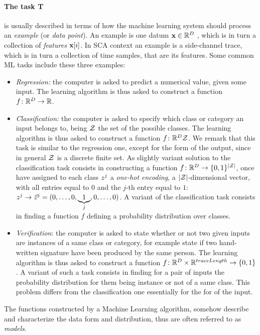 \paragraph*{The task T} is usually described in terms of how the machine learning system should process an \emph{example} (or \emph{data point}). An example is one datum $\textbf{x}\in \mathbb{R}^D$ , which is in turn a collection of \emph{features} $\textbf{x}[i]$. In SCA context an example is a side-channel trace, which is in turn a collection of time samples, that are its features. Some common ML tasks include these three examples: 
\begin{itemize}
\item \emph{Regression: } the computer is asked to predict a numerical value, given some input. The learning algorithm is thus asked to construct a function $f\colon \mathbb{R}^D \rightarrow \mathbb{R}$.
\item \emph{Classification: } the computer is asked to specify which class or category an input belongs to, being $\mathcal{Z}$ the set of the possible classes. The learning algorithm is thus asked to construct a function $f\colon \mathbb{R}^D \mathcal{Z}$. We remark that this task is similar to the regression one, except for the form of the output, since in general $\mathcal{Z}$ is a discrete finite set. As slightly variant solution to the classification task consists in constructing a function $f\colon \mathbb{R}^D \rightarrow \{0,1\}^{\lvert\mathcal{Z}\rvert}$, once have assigned to each class $z^j$ a \emph{one-hot encoding}, \ie  a $\lvert\mathcal{Z}\rvert$-dimensional vector,
with all entries equal to $0$ and the $j$-th entry equal to $1$: $z^j
\rightarrow \vec{z}^j = (0,\ldots , 0,\underbrace{1}_{j},0,\dots,0)$. A variant of the classification task consists in finding a function $f$ defining a probability distribution over classes.
\item \emph{Verification}: the computer is asked to state whether or not two given inputs are instances of a same class or category, for example state if two hand-written signature have been produced by the same person. The learning algorithm is thus asked to construct a function $f\colon \mathbb{R}^D \times \mathbb{R}^{traceLength}\rightarrow \{0,1\}$. A variant of such a task consists in finding for a pair of inputs the probability distribution for them being instance or not of a same class. This problem differs from the classification one essentially for the for of the input.
\end{itemize}
The functions constructed by a Machine Learning algorithm, somehow describe and characterize the data form and distribution, thus are often referred to as \emph{models}.

